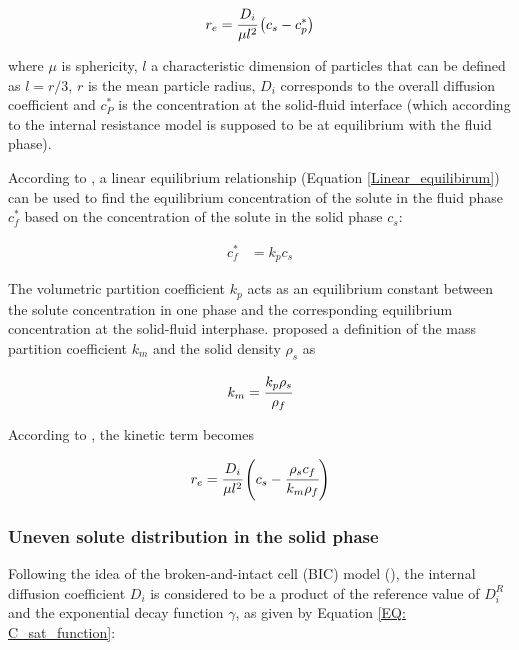 \documentclass[a4paper,fleqn]{cas-dc}
\begin{document}
		{\footnotesize
			\begin{equation} \label{Model_kinetic_basic}
				r_e = \cfrac{D_i}{\mu l^2 }\left(c_s - c_p^* \right)
		\end{equation} }
		
		where $\mu$ is sphericity, $l$ a characteristic dimension of particles that can be defined as $l = r/3$, $r$ is the mean particle radius, $D_i$ corresponds to the overall diffusion coefficient and $c_P^*$ is the concentration at the solid-fluid interface (which according to the internal resistance model is supposed to be at equilibrium with the fluid phase). 
		
		According to \citet{Bulley1984}, a linear equilibrium relationship (Equation \ref{Linear_equilibirum}) can be used to find the equilibrium concentration of the solute in the fluid phase $c_f^*$ based on the concentration of the solute in the solid phase $c_s$:
		
		{\footnotesize
			\begin{align} \label{Linear_equilibirum}
				c_f^* &= k_p c_s
		\end{align} }
		
		The volumetric partition coefficient $k_p$ acts as an equilibrium constant between the solute concentration in one phase and the corresponding equilibrium concentration at the solid-fluid interphase. \citet{Spiro2007} proposed a definition of the mass partition coefficient $k_m$ and the solid density $\rho_s$ as 
		
		{\footnotesize
			\begin{align}
				k_m = \cfrac{k_p \rho_s}{\rho_f}
		\end{align} }
		
		According to \citet{Reverchon1996}, the kinetic term becomes
		
		{\footnotesize
			\begin{equation}
				\label{Model_kinetic_no_sat}
				r_e = \cfrac{D_i}{ \mu l^2 } \left(c_s - \cfrac{\rho_s c_f}{k_m \rho_f} \right)
		\end{equation} }
		
		\subsubsection{Uneven solute distribution in the solid phase} \label{CH: Gamma_Function}
		
		Following the idea of the broken-and-intact cell (BIC) model (\citet{Sovova2017}), the internal diffusion coefficient $D_i$ is considered to be a product of the reference value of $D_i^R$ and the exponential decay function $\gamma$, as given by Equation \ref{EQ: C_sat_function}:
		
\end{document}
